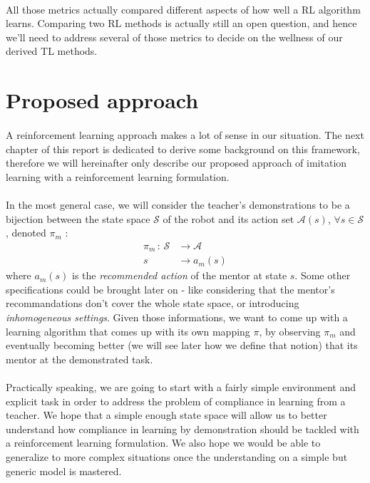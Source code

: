 \documentclass[a4paper]{report}
\begin{document}
{{{				\paragraph{} All those metrics actually compared different aspects of how well a RL algorithm learns. Comparing two RL methods is actually still an open question, and hence we'll need to address several of those metrics to decide on the wellness of our derived TL methods. 
			}
		}
		\section{Proposed approach}
		{
			\paragraph{} A reinforcement learning approach makes a lot of sense in our situation. The next chapter of this report is dedicated to derive some background on this framework, therefore we will hereinafter only describe our proposed approach of imitation learning with a reinforcement learning formulation. 
			
			\paragraph{} In the most general case, we will consider the teacher's demonstrations to be a bijection between the state space $\mathcal{S}$ of the robot and its action set $\mathcal{A}(s)$, $\forall s\in\mathcal{S}$, denoted $\pi_m$ : 
			\begin{equation}
				\begin{aligned}
					\pi_m \, :  \, \mathcal{S} &\to \mathcal{A}\\
						     s &\to a_m(s) 
				\end{aligned}
			\end{equation}
			where $a_m(s)$ is the \emph{recommended action} of the mentor at state $s$. Some other specifications could be brought later on - like considering that the mentor's recommandations don't cover the whole state space, or introducing \emph{inhomogeneous settings}. Given those informations, we want to come up with a learning algorithm that comes up with its own mapping $\pi$, by observing $\pi_m$ and eventually becoming better (we will see later how we define that notion) that its mentor at the demonstrated task. 
			

			\paragraph{} Practically speaking, we are going to start with a fairly simple environment and explicit task in order to address the problem of compliance in learning from a teacher. We hope that a simple enough state space will allow us to better understand how compliance in learning by demonstration should be tackled with a reinforcement learning formulation.  We also hope we would be able to generalize to more complex situations once the understanding on a simple but generic model is mastered. 
			
}}
\end{document}
